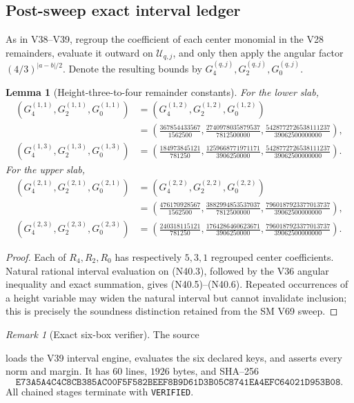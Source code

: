 \documentclass[11pt]{article}
\newtheorem{lemma}[theorem]{Lemma}
\theoremstyle{definition}
\theoremstyle{remark}
\newtheorem{remark}[theorem]{Remark}
\begin{document}
\subsection{Post-sweep exact interval ledger}

As in V38--V39, regroup the coefficient of each center monomial in the
V28 remainders, evaluate it outward on \(\mathcal U_{q,j}\), and only then
apply the angular factor \((4/3)^{|a-b|/2}\).  Denote the resulting bounds
by \(G^{(q,j)}_4,G^{(q,j)}_2,G^{(q,j)}_0\).

\begin{lemma}[Height-three-to-four remainder constants]
\label{lem:f2v40-ledger}
For the lower slab,
\[
\begin{aligned}
 (G^{(1,1)}_4,G^{(1,1)}_2,G^{(1,1)}_0)
 &=(G^{(1,2)}_4,G^{(1,2)}_2,G^{(1,2)}_0)\\
 &=\left(\frac{367854433567}{1562500},
 \frac{2740978035879537}{7812500000},
 \frac{5428772726538111237}{39062500000000}\right),\\
 (G^{(1,3)}_4,G^{(1,3)}_2,G^{(1,3)}_0)
 &=\left(\frac{184973845121}{781250},
 \frac{1259668771971171}{3906250000},
 \frac{5428772726538111237}{39062500000000}\right).
\end{aligned}
\tag{N40.5}
\]
For the upper slab,
\[
\begin{aligned}
 (G^{(2,1)}_4,G^{(2,1)}_2,G^{(2,1)}_0)
 &=(G^{(2,2)}_4,G^{(2,2)}_2,G^{(2,2)}_0)\\
 &=\left(\frac{476170928567}{1562500},
 \frac{3882994853537037}{7812500000},
 \frac{7960187923377013737}{39062500000000}\right),\\
 (G^{(2,3)}_4,G^{(2,3)}_2,G^{(2,3)}_0)
 &=\left(\frac{240318115121}{781250},
 \frac{1764286460623671}{3906250000},
 \frac{7960187923377013737}{39062500000000}\right).
\end{aligned}
\tag{N40.6}
\]
\end{lemma}

\begin{proof}
Each of \(R_4,R_2,R_0\) has respectively \(5,3,1\) regrouped center
coefficients.  Natural rational interval evaluation on
\textup{(N40.3)}, followed by the V36 angular inequality and exact
summation, gives \textup{(N40.5)}--\textup{(N40.6)}.  Repeated occurrences
of a height variable may widen the natural interval but cannot invalidate
inclusion; this is precisely the soundness distinction retained from the
SM V69 sweep.
\end{proof}

\begin{remark}[Exact six-box verifier]
\label{rem:f2v40-verifier}
The source
\begin{center}
\end{center}
loads the V39 interval engine, evaluates the six declared keys, and asserts
every norm and margin.  It has \(60\) lines, \(1926\) bytes, and SHA--256
\[
\texttt{E73A5A4C4C8CB385AC00F5F582BEEF8B9D61D3B05C8741EA4EFC64021D953B08}.
\tag{N40.7}
\]
All chained stages terminate with \texttt{VERIFIED}.
\end{remark}
\end{document}

